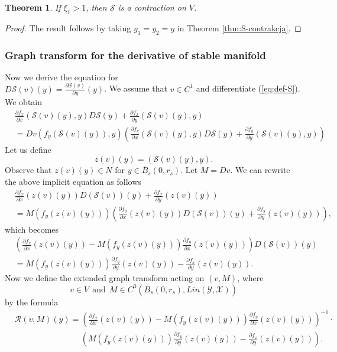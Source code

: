 \documentclass[11pt, leqno]{amsart}
\newtheorem{thm}{Theorem}[section]
\theoremstyle{definition}
\begin{document}
\begin{thm}\label{Scontraction}
	If $\xi_1>1$, then $\mathcal{S}$ is a contraction on $V$.
	\end{thm}
\begin{proof}
	The result follows by taking $y_1=y_2=y$ in Theorem \ref{thm:S-contrakcja}.
	\end{proof}

\subsubsection{Graph transform for the derivative of stable manifold}

Now we derive the equation for \\
$D \mathcal{S}(v)(y)=\frac{\partial \mathcal{S}(v)}{\partial y}(y)$.  We assume that $v \in C^1$ and differentiate (\ref{eq:def-S}). We obtain
\begin{align*}
&  \frac{\partial f_x}{\partial x}(\mathcal{S}(v)(y),y) D \mathcal{S}(y) +  \frac{\partial f_x}{\partial y}(\mathcal{S}(v)(y),y)\\
 & =      D v(f_y(\mathcal{S}(v)(y)),y)\left(\frac{\partial f_y}{\partial x}(\mathcal{S}(v)(y),y) D \mathcal{S}(y) +  \frac{\partial f_y}{\partial y}(\mathcal{S}(v)(y),y) \right)
\end{align*}
Let us define
\begin{equation}
z(v)(y)=(\mathcal{S}(v)(y),y).
\end{equation}
Observe that $z(v)(y) \in N$ for $y \in \overline{B}_s(0,r_s)$. Let $M=D v$. We can rewrite the above implicit equation as follows
\begin{align*}
  & \frac{\partial f_x}{\partial x}(z(v)(y)) D (\mathcal{S}(v))(y) +  \frac{\partial f_x}{\partial y}(z(v)(y))\\
   & =   M(f_y(z(v)(y)))\left(\frac{\partial f_y}{\partial x}(z(v)(y)) D (\mathcal{S}(v))(y) +  \frac{\partial f_y}{\partial y}(z(v)(y)) \right),
\end{align*}
which becomes
\begin{align*}
 & \left(\frac{\partial f_x}{\partial x}(z(v)(y)) -  M(f_y(z(v)(y))) \frac{\partial f_y}{\partial x}(z(v)(y)) \right) D (\mathcal{S}(v))(y)  \nonumber \\
   & =     M(f_y(z(v)(y)))\frac{\partial f_y}{\partial y}(z(v)(y)) -   \frac{\partial f_x}{\partial y}(z(v)(y)).
\end{align*}
Now we define the extended graph transform acting on $(v,M)$, where
$$v \in V\ \ \textrm{and}\ \   M \in C^0(\overline{B}_s(0,r_s),Lin(\mathcal{Y},\mathcal{X}))$$ by the formula
\begin{align}
&   \mathcal{R}(v,M)(y)= \left(\frac{\partial f_x}{\partial x}(z(v)(y)) -  M(f_y(z(v)(y))) \frac{\partial f_y}{\partial x}(z(v)(y)) \right)^{-1} \cdot  \label{eq:S2-def} \\
   & \qquad \qquad \qquad \qquad   \left( M(f_y(z(v)(y)))\frac{\partial f_y}{\partial y}(z(v)(y)) -   \frac{\partial f_x}{\partial y}(z(v)(y)) \right). \nonumber
\end{align}
\end{document}
